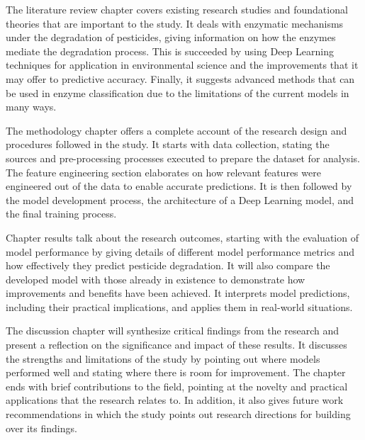 The literature review chapter covers existing research studies and foundational theories that are important to the study. It deals with enzymatic mechanisms under the degradation of pesticides, giving information on how the enzymes mediate the degradation process. This is succeeded by using Deep Learning techniques for application in environmental science and the improvements that it may offer to predictive accuracy. Finally, it suggests advanced methods that can be used in enzyme classification due to the limitations of the current models in many ways.

The methodology chapter offers a complete account of the research design and procedures followed in the study. It starts with data collection, stating the sources and pre-processing processes executed to prepare the dataset for analysis. The feature engineering section elaborates on how relevant features were engineered out of the data to enable accurate predictions. It is then followed by the model development process, the architecture of a Deep Learning model, and the final training process.

Chapter results talk about the research outcomes, starting with the evaluation of model performance by giving details of different model performance metrics and how effectively they predict pesticide degradation. It will also compare the developed model with those already in existence to demonstrate how improvements and benefits have been achieved. It interprets model predictions, including their practical implications, and applies them in real-world situations.

The discussion chapter will synthesize critical findings from the research and present a reflection on the significance and impact of these results. It discusses the strengths and limitations of the study by pointing out where models performed well and stating where there is room for improvement. The chapter ends with brief contributions to the field, pointing at the novelty and practical applications that the research relates to. In addition, it also gives future work recommendations in which the study points out research directions for building over its findings.